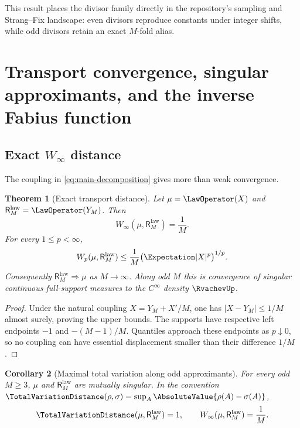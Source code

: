\documentclass[11pt,oneside]{article}
\newtheorem{theorem}{Theorem}[section]
\newtheorem{corollary}[theorem]{Corollary}
\theoremstyle{definition}
\theoremstyle{remark}
\newcommand{\ReciprocalIntegerLaw}[1]{\mathsf R^{\mathrm{law}}_{#1}}
\begin{document}
This result places the divisor family directly in the repository's sampling and
Strang--Fix landscape: even divisors reproduce constants under integer shifts, while odd
divisors retain an exact $M$-fold alias.

\section{Transport convergence, singular approximants, and the inverse Fabius function}
\label{sec:transport-inverse}

\subsection{Exact $W_\infty$ distance}

The coupling in \eqref{eq:main-decomposition} gives more than weak convergence.

\begin{theorem}[Exact transport distance]
\label{thm:Winfty}
Let $\mu=\LawOperator(X)$ and $\ReciprocalIntegerLaw{M}=\LawOperator(Y_M)$.  Then
\begin{equation}
 W_\infty(\mu,\ReciprocalIntegerLaw{M})=\frac1M.
 \label{eq:Winfty-exact}
\end{equation}
For every $1\le p<\infty$,
\begin{equation}
 W_p(\mu,\ReciprocalIntegerLaw{M})
 \le\frac1M\bigl(\Expectation|X|^p\bigr)^{1/p}.
 \label{eq:Wp-bound}
\end{equation}
Consequently $\ReciprocalIntegerLaw{M}\Rightarrow\mu$ as $M\to\infty$.  Along odd $M$ this is convergence
of singular continuous full-support measures to the $C^\infty$ density $\RvachevUp$.
\end{theorem}

\begin{proof}
Under the natural coupling $X=Y_M+X'/M$, one has $|X-Y_M|\le1/M$ almost surely, proving
the upper bounds.  The supports have respective left endpoints $-1$ and
$-(M-1)/M$.  Quantiles approach these endpoints as $p\downarrow0$, so no coupling can
have essential displacement smaller than their difference $1/M$.
\end{proof}

\begin{corollary}[Maximal total variation along odd approximants]
\label{cor:TV}
For every odd $M\ge3$, $\mu$ and $\ReciprocalIntegerLaw{M}$ are mutually singular.  In the convention
$\TotalVariationDistance(\rho,\sigma)
 =\sup_A\AbsoluteValue{\rho(A)-\sigma(A)}$,
\begin{equation}
 \TotalVariationDistance(\mu,\ReciprocalIntegerLaw{M})=1,
 \qquad
 W_\infty(\mu,\ReciprocalIntegerLaw{M})=\frac1M.
 \label{eq:TV-Wcontrast}
\end{equation}
\end{corollary}
\end{document}
